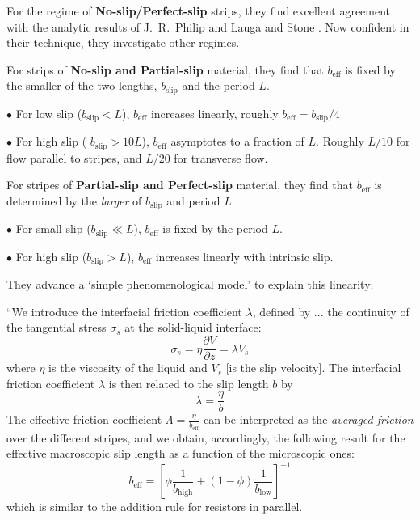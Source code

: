 \documentclass[12pt, a4paper, twoside, openright]{book}
\newcommand{\beff}{\ensuremath{b_{\mathrm{eff}}}}
\begin{document}
For the regime of \textbf{No-slip/Perfect-slip} strips, they find excellent agreement with the analytic results of J.\ R.\ Philip \cite{Philip1972} and Lauga and Stone \cite{LaugaStone2003}.  Now confident in their technique, they investigate other regimes.

For strips of \textbf{No-slip and Partial-slip} material, they find that $\beff$ is fixed by the smaller of the two lengths, $b_{\mathrm{slip}}$ and the period $L$.

$\bullet$ For low slip ($b_{\mathrm{slip}} < L$), $\beff$ increases linearly, roughly $\beff = b_{\mathrm{slip}} / 4$

$\bullet$ For high slip ( $b_{\mathrm{slip}} > 10L$), $\beff$ asymptotes to a fraction of $L$. Roughly $L/10$ for flow parallel to stripes, and $L/20$ for transverse flow.

\vspace{1em}

For stripes of \textbf{Partial-slip and Perfect-slip} material, they find that $\beff$ is determined by the \emph{larger} of $b_{\mathrm{slip}}$ and period $L$.

$\bullet$ For small slip ($b_{\mathrm{slip}} \ll L$), $\beff$ is fixed by the period $L$.

$\bullet$ For high slip ($b_{\mathrm{slip}} > L$), $\beff$ increases linearly with intrinsic slip.

They advance a `simple phenomenological model' to explain this linearity:

``We introduce the interfacial friction coefficient $\lambda$, defined by ... the continuity of the tangential stress $\sigma_s$ at the solid-liquid interface:
\begin{equation}
\sigma_s = \eta \frac{\partial V}{\partial z} = \lambda V_s
\end{equation}
where $\eta$ is the viscosity of the liquid and $V_s$ [is the slip velocity]. The interfacial friction coefficient $\lambda$ is then related to the slip length $b$ by
\begin{equation}
\lambda = \frac{\eta}{b}
\end{equation}
The effective friction coefficient $\Lambda = \frac{\eta}{\beff}$ can be interpreted as the \emph{averaged friction} over the different stripes, and we obtain, accordingly, the following result for the effective macroscopic slip length as a function of the microscopic ones:
\begin{equation}
\beff = \left[ \phi \frac{1}{ b_{\mathrm{high}} }  + (1 -\phi) \frac{1}{ b_{\mathrm{low}}} \right]^{-1}
\end{equation}
which is similar to the addition rule for resistors in parallel.
\end{document}
